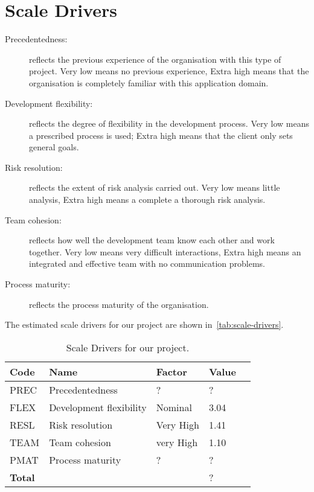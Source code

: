 \section{Scale Drivers}

\begin{description}
    
    \item[Precedentedness:] reflects the previous experience of the organisation with this type of project. Very low means no previous experience, Extra high means that the organisation is completely familiar with this application domain.

    \item[Development flexibility:] reflects the degree of flexibility in the development process. Very low means a prescribed process is used; Extra high means that the client only sets general goals.

    \item[Risk resolution:] reflects the extent of risk analysis carried out. Very low means little analysis, Extra high means a complete a thorough risk analysis.

    \item[Team cohesion:] reflects how well the development team know each other and work together. Very low means very difficult interactions, Extra high means an integrated and effective team with no communication problems.

    \item[Process maturity:] reflects the process maturity of the organisation.

\end{description}

The estimated scale drivers for our project are shown in~\autoref{tab:scale-drivers}.

\begin{table}[h]
    \centering
    \begin{tabular}{| l | l | l | l | l |}
        \hline
        \textbf{Code}   & \textbf{Name}             & \textbf{Factor}   & \textbf{Value}    \\
        \hline
        PREC            & Precedentedness           & ?                 & ?                 \\
        \hline
        FLEX            & Development flexibility   & Nominal           & 3.04                 \\
        \hline
        RESL            & Risk resolution           & Very High         & 1.41                 \\
        \hline
        TEAM            & Team cohesion             & very High         & 1.10                 \\
        \hline
        PMAT            & Process maturity          & ?                 & ?                 \\
        \hline
        \textbf{Total}  & \multicolumn{2}{|c|}{~}                       & ?                 \\
        \hline
    \end{tabular}
    \caption{Scale Drivers for our project.}
    \label{tab:scale-drivers}
\end{table}
